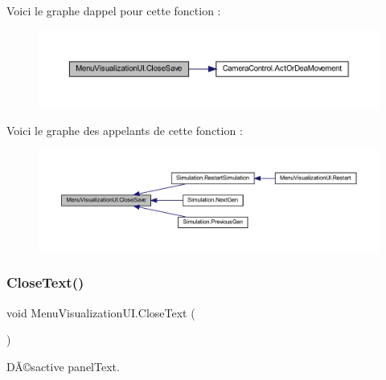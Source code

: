 Voici le graphe d\textquotesingle{}appel pour cette fonction \+:\nopagebreak
\begin{figure}[H]
\begin{center}
\leavevmode
\includegraphics[width=350pt]{class_menu_visualization_u_i_a262b9857eed5d1a7e749beb653a88cad_cgraph}
\end{center}
\end{figure}
Voici le graphe des appelants de cette fonction \+:\nopagebreak
\begin{figure}[H]
\begin{center}
\leavevmode
\includegraphics[width=350pt]{class_menu_visualization_u_i_a262b9857eed5d1a7e749beb653a88cad_icgraph}
\end{center}
\end{figure}
\mbox{\label{class_menu_visualization_u_i_a5f689cefeb05b7bfdc19c56179deb6ef}} 
\subsubsection{\texorpdfstring{Close\+Text()}{CloseText()}}
{\footnotesize\ttfamily void Menu\+Visualization\+U\+I.\+Close\+Text (\begin{DoxyParamCaption}{ }\end{DoxyParamCaption})\hspace{0.3cm}{\ttfamily [inline]}}



DÃ©sactive panel\+Text. 

\mbox{\label{class_menu_visualization_u_i_ade48d2d4dd652f9f693072bf3d6a5c1c}} 
